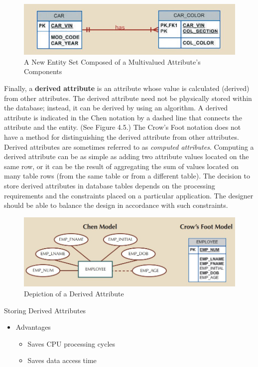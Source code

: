 \documentclass[a4paper, 12pt, titlepage]{report}
\begin{document}
{\begin{enumerate}
\begin{figure}[H]
\centering
\includegraphics[scale=0.5]{Attr4}
\caption{A New Entity Set Composed of a Multivalued Attribute's Components}
\end{figure}
\end{enumerate}
\noindent Finally, a \textbf{derived attribute} is an attribute whose value is calculated (derived) from other attributes. The derived attribute need not be physically stored within the database; instead, it can be derived by using an algorithm.  A derived attribute is indicated in the Chen notation by a dashed line that connects the attribute and the entity. (See Figure 4.5.) The Crow’s Foot notation does not have a method for distinguishing the derived attribute from other attributes. Derived attributes are sometimes referred to as \emph{computed attributes}. Computing a derived attribute can be as simple as adding two attribute values located on the same row, or it can be the result of aggregating the sum of values located on many table rows (from the same table or from a different table). The decision to store derived attributes in database tables depends on the processing requirements and the constraints placed on a particular application. The designer should be able to balance the design in accordance with such constraints. 
\begin{figure}[H]
\centering
\includegraphics[scale=0.5]{Attr5}
\caption{Depiction of a Derived Attribute}
\end{figure}
Storing Derived Attributes
\begin{itemize}
\item Advantages
\begin{itemize}
\item Saves CPU processing cycles
\item Saves data access time

\end{itemize}
\end{itemize}}
\end{document}
